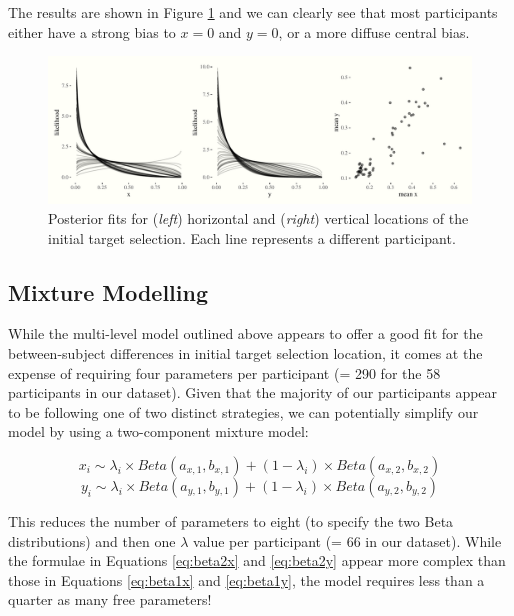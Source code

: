 \documentclass[vision,article,submit,pdftex,moreauthors]{Definitions/mdpi}
\begin{document}
The results are shown in Figure \ref{fig:qjep_init_sel_mdl} and we can clearly see that most participants either have a strong bias to $x=0$ and $y=0$, or a more diffuse central bias. 

\begin{figure}[H]
\centering
\includegraphics[width=12 cm]{Figures/init_sel_mdl.pdf}
\caption{Posterior fits for (\textit{left}) horizontal and (\textit{right}) vertical locations of the initial target selection. Each line represents a different participant.}
\label{fig:qjep_init_sel_mdl}
\end{figure} 

\subsection{Mixture Modelling}

While the multi-level model outlined above appears to offer a good fit for the between-subject differences in initial target selection location, it comes at the expense of requiring four parameters per participant (= 290 for the 58 participants in our dataset). Given that the majority of our participants appear to be following one of two distinct strategies, we can potentially simplify our model by using a two-component mixture model:

\begin{equation}
    x_i \sim \lambda_i \times Beta(a_{x,1}, b_{x,1}) + (1-\lambda_i) \times Beta(a_{x,2}, b_{x,2})
    \label{eq:beta2x}
\end{equation}
\begin{equation}
    y_i \sim \lambda_i \times Beta(a_{y,1}, b_{y,1}) + (1-\lambda_i) \times Beta(a_{y,2}, b_{y,2})
    \label{eq:beta2y}
\end{equation}

This reduces the number of parameters to eight (to specify the two Beta distributions) and then one $\lambda$ value per participant (= 66 in our dataset). While the formulae in Equations \ref{eq:beta2x} and \ref{eq:beta2y} appear more complex than those in Equations \ref{eq:beta1x} and \ref{eq:beta1y}, the model requires less than a quarter as many free parameters! 
\end{document}
